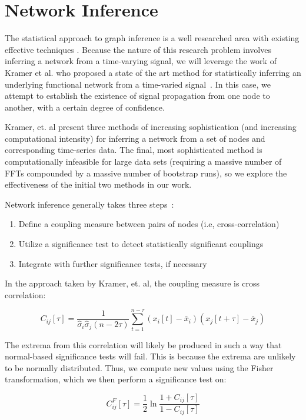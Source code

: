 \section{Network Inference} 
The statistical approach to graph inference is a well researched area with existing effective techniques \cite{AlbertMechanics}. Because the nature of this research problem involves inferring a network from a time-varying signal, we will leverage the work of Kramer et al. who proposed a state of the art method for statistically inferring an underlying functional network from a time-varied signal~\cite{kramer}. In this case, we attempt to establish the existence of signal propagation from one node to another, with a certain degree of confidence. 

Kramer, et. al present three methods of increasing sophistication (and increasing computational intensity) for inferring a network from a set of nodes and corresponding time-series data. The final, most sophisticated method is computationally infeasible for large data sets (requiring a massive number of FFTs compounded by a massive number of bootstrap runs), so we explore the effectiveness of the initial two methods in our work. 

Network inference generally takes three steps~\cite{kramer}:
\begin{enumerate}
\item Define a coupling measure between pairs of nodes (i.e, cross-correlation)
\item Utilize a significance test to detect statistically significant couplings
\item Integrate with further significance tests, if necessary
\end{enumerate}

In the approach taken by Kramer, et. al, the coupling measure is cross correlation:

\[ C_{ij}[\tau] = \frac{1}{\hat\sigma_i\hat\sigma_j (n-2\tau)}\sum_{t=1}^{n-\tau}(x_i[t] - \bar x_i )(x_j[t+\tau] - \bar x_j) \]

The extrema from this correlation will likely be produced in such a way that normal-based significance tests will fail.
This is because the extrema are unlikely to be normally distributed.  
Thus, we compute new values using the Fisher transformation, which we then perform a significance test on:

\[ C_{ij}^F [\tau] = \frac{1}{2} \ln \frac{1+C_{ij}[\tau]}{1-C_{ij}[\tau]} \]


